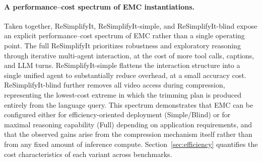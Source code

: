 \paragraph{A performance--cost spectrum of EMC instantiations.}
Taken together, ReSimplifyIt, ReSimplifyIt-simple, and ReSimplifyIt-blind expose an explicit performance--cost spectrum of EMC rather than a single operating point. The full ReSimplifyIt prioritizes robustness and exploratory reasoning through iterative multi-agent interaction, at the cost of more tool calls, captions, and LLM turns. ReSimplifyIt-simple flattens the interaction structure into a single unified agent to substantially reduce overhead, at a small accuracy cost. ReSimplifyIt-blind further removes all video access during compression, representing the lowest-cost extreme in which the trimming plan is produced entirely from the language query. This spectrum demonstrates that EMC can be configured either for efficiency-oriented deployment (Simple/Blind) or for maximal reasoning capability (Full) depending on application requirements, and that the observed gains arise from the compression mechanism itself rather than from any fixed amount of inference compute. Section~\ref{sec:efficiency} quantifies the cost characteristics of each variant across benchmarks.

